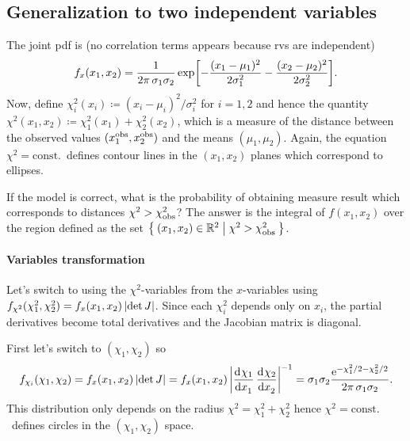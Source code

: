 \documentclass[
	10pt,
	draft
]{scrreprt}
\newcommand{\eu}{\ensuremath{\mathrm{e}}}
\newcommand{\deriv}[3][]{\dfrac{\ud^{#1}#2}{\ud #3^{#1}}}%
\begin{document}
		\subsection{Generalization to two independent variables}

The joint \ac{pdf} is (no correlation terms appears because \acp{rv} are independent)
\begin{equation}
f_x(x_1,x_2) = \frac{1}{2\pi\,\sigma_1\sigma_2}\exp\qp*{
-\frac{(x_1-\mu_1)^2}{2\sigma_1^2}
-\frac{(x_2-\mu_2)^2}{2\sigma_2^2}
}.
\end{equation}
Now, define $\chi^2_i(x_i)\coloneqq (x_i-\mu_i)^2\!/\sigma_i^2$ for $i=1,2$ and hence the quantity $\chi^2(x_1,x_2) \coloneqq \chi^2_1(x_1) + \chi^2_2(x_2)$, which is a measure of the distance between the observed values $(x_1^\textup{obs},x_2^\textup{obs})$ and the means $(\mu_1,\mu_2)$.
Again, the equation $\chi^2 = \text{const.}$~defines contour lines in the $(x_1,x_2)$ planes which correspond to ellipses.


If the model is correct, what is the probability of obtaining measure result which corresponds to distances $\chi^2 > \chi^2_\textup{obs}$?
The answer is the integral of $f(x_1,x_2)$ over the region defined as the set $\Set{(x_1,x_2)\in\ensuremath{\mathbb{R}}^2|\chi^2 > \chi^2_\textup{obs}}$.


\paragraph{Variables transformation}
Let's switch to using the $\chi^2$-variables from the $x$-variables using $f_{\chi^2}(\chi^2_1,\chi^2_2) = f_x(x_1,x_2)\,\lvert\det J\rvert$.
Since each $\chi^2_i$ depends only on $x_i$, the partial derivatives become total derivatives and the Jacobian matrix is diagonal.


First let's switch to $(\chi_1,\chi_2)$ so
\begin{equation}\label{eq:chiIplane}
f_{\chi_i}(\chi_1,\chi_2) = f_x(x_1,x_2)\,\abs{\det J} = f_x(x_1,x_2)\,\abs*{\deriv{\chi_1}{x_1}\,\deriv{\chi_2}{x_2}}^{-1} = \sigma_1\sigma_2 \frac{\eu^{-\chi^2_1/2 - \chi^2_2/2 }}{2\pi\,\sigma_1\sigma_2}.
\end{equation}
This distribution only depends on the radius $\chi^2  = \chi_1^2 + \chi_2^2$ hence $\chi^2 = \text{const.}$~defines circles in the $(\chi_1,\chi_2)$ space.
\end{document}
